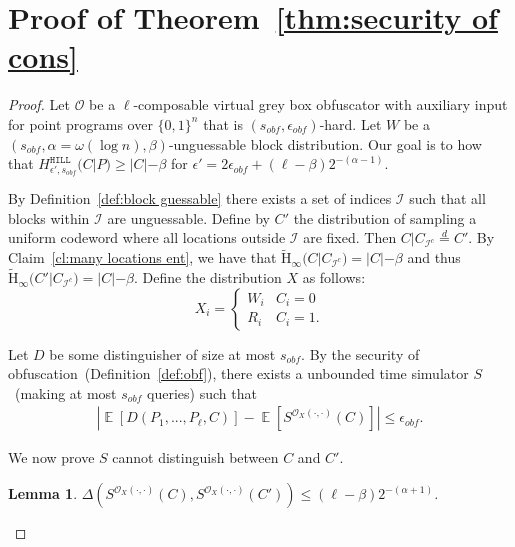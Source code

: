 \documentclass[11pt]{article}
\newcommand{\thref}[1]{\mbox{Theorem~\ref{#1}}}
\newcommand{\defref}[1]{\mbox{Definition~\ref{#1}}}
\newcommand{\clref}[1]{\mbox{Claim~\ref{#1}}}
\DeclareMathOperator*{\expe}{\mathbb{E}}
\newcommand{\zo}{\ensuremath{\{0, 1\}}}
\newcommand{\hill}{\ensuremath{\mathtt{HILL}}\xspace}
\newcommand{\Hav}{\tilde{\mathrm{H}}_\infty}
\newtheorem{lemma}[theorem]{Lemma}
\begin{document}
\section{Proof of \thref{thm:security of cons}}
\label{app:security of main cons}
\begin{proof}

Let $\mathcal{O}$ be a $\ell$-composable virtual grey box obfuscator with auxiliary input for point programs over $\zo^n$ that is $(s_{obf}, \epsilon_{obf})$-hard.  Let $W$ be a $(s_{obf}, \alpha = \omega(\log n), \beta)$-unguessable block distribution.  Our goal is to how that $H^{\hill}_{\epsilon', s_{obf}}(C|P)\geq |C|- \beta$ for $\epsilon' = 2\epsilon_{obf} + (\ell - \beta)2^{-(\alpha-1)}$.  

By \defref{def:block guessable} there exists a set of indices $\mathcal{I}$ such that all blocks within $\mathcal{I}$ are unguessable.  Define by $C'$ the distribution of sampling a uniform codeword where all locations outside $\mathcal{I}$ are fixed.  Then $C | C_{\mathcal{I}^c} \overset{d}=C'$.  By \clref{cl:many locations ent}, we have that $\Hav(C|C_{\mathcal{I}^c} )= |C| -\beta$ and thus $\Hav(C'| C_{\mathcal{I}^c}) = |C| -\beta$.  Define the distribution $X$ as follows:
\[X_i =
\begin{cases}
W_i & C_i = 0\\
R_i & C_i = 1.
\end{cases}\]

Let $D$ be some distinguisher of size at most $s_{obf}$.  By the security of obfuscation~(\defref{def:obf}), there exists a unbounded time simulator $S$~(making at most $s_{obf}$ queries) such that
\begin{align}
\label{eq:dist before}
|\expe [D(P_1,..., P_\ell, C)] - \expe [S^{\mathcal{O}_X(\cdot, \cdot)}(C)] |\leq \epsilon_{obf}.
\end{align}

We now prove $S$ cannot distinguish between $C$ and $C'$.
\begin{lemma}
\label{lem:sim cannot distinguish}
$\Delta(S^{\mathcal{O}_X(\cdot, \cdot)}(C), S^{\mathcal{O}_X(\cdot, \cdot)}(C')) \le (\ell-\beta) 2^{-(\alpha+1)}$.
\end{lemma}


\end{proof}
\end{document}
